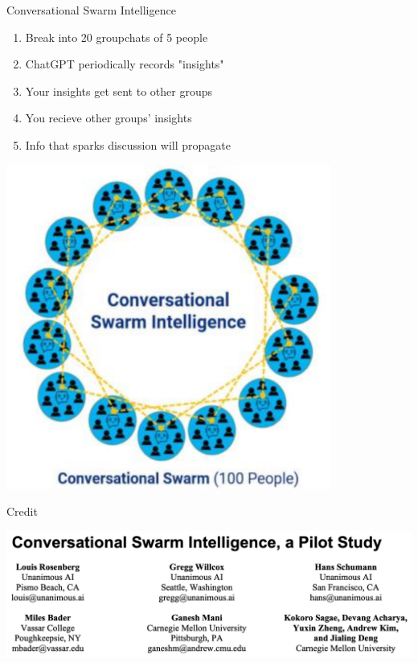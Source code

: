 \documentclass[aspectratio=35]{beamer} %
\begin{document}
\begin{frame}{Conversational Swarm Intelligence}
\vspace{-0.5in}
\begin{enumerate}
    \item Break into 20 groupchats of 5 people
    \item ChatGPT periodically records "insights"
    \item Your insights get sent to other groups
    \item You recieve other groups' insights
    \item Info that sparks discussion will propagate
\end{enumerate}
\centering
\includegraphics[width=0.8\textwidth]{imgs/CSI_section/conversational_swarm.png}
\end{frame}

\begin{frame}{Credit}
\vspace{-1.5in}
\begin{center}
\includegraphics[width=\textwidth]{imgs/CSI_section/authors.png}
\end{center}
\end{frame}
\end{document}
